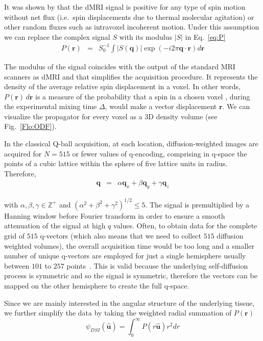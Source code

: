 \documentclass{bioinfo}
\begin{document}
\noindent It was shown by \citet{Wedeen} that the dMRI
signal is positive for any type of spin motion without net flux (i.e.~spin
displacements due to thermal molecular agitation) or other random
fluxes such as intravoxel incoherent motion. Under this assumption
we can replace the complex signal $S$ with its modulus $|S|$ in
Eq.~\ref{eq:P} \begin{eqnarray}
P(\mathbf{r}) & = & S_{0}^{-1}\int|S(\mathbf{q})|\exp(-i2\pi\mathbf{q}\cdot\mathbf{r})d\mathbf{r}\label{eq:P_modulus}\end{eqnarray}


The modulus of the signal coincides with the output of the standard
MRI scanners as dMRI and that simplifies the acquisition procedure.
It represents the density of the average relative spin displacement
in a voxel. In other words, $P(\mathbf{r})\, d\mathbf{r}$ is a measure
of the probability that a spin in a chosen voxel , during the experimental
mixing time $\Delta$, would make a vector displacement $\mathbf{r}$.
We can visualize the propagator for every voxel as a 3D density volume
(see Fig.~\ref{Flo:ODF}).

In the classical Q-ball acquisition, at each location, diffusion-weighted
images are acquired for $N=515$ or fewer values of q-encoding, comprising
in q-space the points of a cubic lattice within the sphere of five
lattice units in radius. Therefore,\begin{eqnarray}
\mathbf{q} & = & \alpha\mathbf{q}_{x}+\beta\mathbf{q}_{y}+\gamma\mathbf{q}_{z}\label{eq:q_lattice}\end{eqnarray}


\noindent with $\alpha,\beta,\gamma\in\mathbb{Z}^{+}$ and $(\alpha^{2}+\beta^{2}+\gamma^{2})^{1/2}\leq5$.
The signal is premultiplied by a Hanning window before Fourier transform
in order to ensure a smooth attenuation of the signal at high $q$
values. Often, to obtain data for the complete grid of $515$ q-vectors
(which also means that we need to collect $515$ diffusion weighted
volumes), the overall acquisition time would be too long and a smaller
number of unique q-vectors are employed for just a single hemisphere
usually between $101$ to $257$ points~\citep{Kuo}. This is valid
because the underlying self-diffusion process is symmetric and so
the signal is symmetric, therefore the vectors can be mapped on the
other hemisphere to create the full q-space. 

Since we are mainly interested in the angular structure of the underlying
tissue, we further simplify the data by taking the weighted radial
summation of $P(\mathbf{r})$\foreignlanguage{british}{\begin{equation}
\psi_{DSI}(\hat{\mathbf{u}})=\int_{0}^{\infty}P(r\hat{\mathbf{u}})r^{2}dr\label{eq:ODF_DSI}\end{equation}
}
\end{document}
